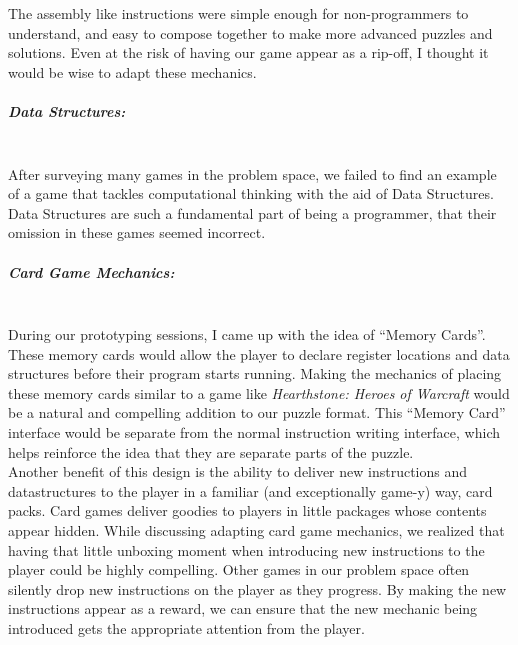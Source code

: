 The assembly like instructions were simple enough for non-programmers to understand, and easy to compose together to make more
advanced puzzles and solutions. Even at the risk of having our game appear as a rip-off, I thought it would be wise to adapt
these mechanics.

\subparagraph{Data Structures:}\mbox{} \\
After surveying many games in the problem space, we failed to find an example of a game that tackles computational thinking
with the aid of Data Structures. Data Structures are such a fundamental part of being a programmer, that their omission in these
games seemed incorrect.

\subparagraph{Card Game Mechanics:}\mbox{} \\
During our prototyping sessions, I came up with the idea of “Memory Cards”.
These memory cards would allow the player to declare register locations and data
structures before their program starts running. Making the mechanics of placing these
memory cards similar to a game like \textit{Hearthstone: Heroes of Warcraft} would be
a natural and compelling addition to our puzzle format. This “Memory Card” interface
would be separate from the normal instruction writing interface, which helps reinforce
the idea that they are separate parts of the puzzle. \\

Another benefit of this design is the ability to deliver new instructions and datastructures
to the player in a familiar (and exceptionally game-y) way, card packs. Card games deliver
goodies to players in little packages whose contents appear hidden. While discussing adapting
card game mechanics, we realized that having that little unboxing moment when introducing new
instructions to the player could be highly compelling. Other games in our problem space often
silently drop new instructions on the player as they progress. By making the new instructions
appear as a reward, we can ensure that the new mechanic being introduced gets the appropriate
attention from the player.

